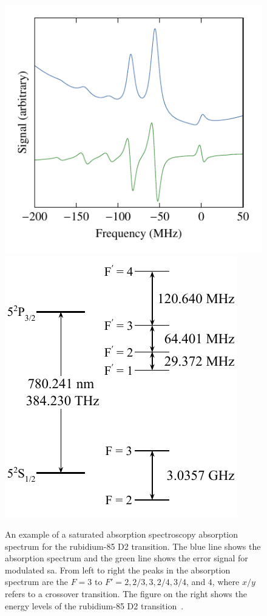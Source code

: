\begin{figure}
    \center
    \includegraphics{part1/Figs/SatAbsSpectrum.pdf}
    \includegraphics{part1/Figs/Rb85_D2_Energy_Levels.pdf}
    \caption[Saturated absorption spectroscopy absorption spectrum.]{An example of a saturated absorption spectroscopy absorption spectrum for the rubidium-85 D2 transition.
    The blue line shows the absorption spectrum and the green line shows the error signal for modulated \gls{sa}.
    From left to right the peaks in the absorption spectrum are the $F=3$ to $F'=2,2/3,3,2/4,3/4$, and $4$, where $x/y$ refers to a crossover transition.
    The figure on the right shows the energy levels of the rubidium-85 D2 transition~\cite{steck_rubidium_2008}.}
    \label{figure:satabsspectrum}
\end{figure}

